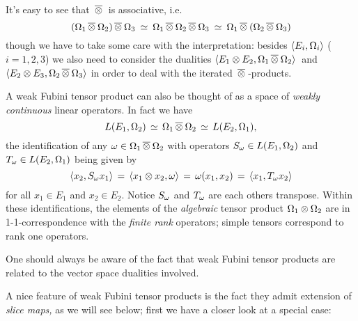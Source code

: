 \begin{remarks_chp} \label{rem:weak_fubtens}
\item
  It's easy to see that $\,\overline{\otimes}\:$ is associative, i.e.
  $$   (\Omega_1 \,\overline{\otimes}\: \Omega_2) \,\overline{\otimes}\: \Omega_3
     \:\simeq\: \Omega_1 \,\overline{\otimes}\: \Omega_2 \,\overline{\otimes}\: \Omega_3
     \:\simeq\: \Omega_1 \,\overline{\otimes}\: (\Omega_2 \,\overline{\otimes}\: \Omega_3) $$
  though we have to take some care with the interpretation:
  besides $\langle E_i,\Omega_i \rangle$ ($i=1,2,3$) we also need to consider the
  dualities \mbox{$\langle E_1 \otimes E_2,\Omega_1 \,\overline{\otimes}\: \Omega_2 \rangle$}\ and
  $\langle E_2 \otimes E_3,\Omega_2 \,\overline{\otimes}\: \Omega_3 \rangle$ in order to deal with
  the iterated $\,\overline{\otimes}\:$-products.
\item
  A weak Fubini tensor product can also be thought of as a space of
  {\em weakly continuous\/} linear operators. In fact we have
  $$ L(E_1,\Omega_2) \,\simeq\, \Omega_1 \,\overline{\otimes}\: \Omega_2 \,\simeq\, L(E_2,\Omega_1),$$
  the identification of any $\omega \in \Omega_1 \,\overline{\otimes}\: \Omega_2$ with
  operators $S_\omega \in L(E_1,\Omega_2)$ and $T_\omega \in L(E_2,\Omega_1)$
  being given by
  $$ \langle x_2,S_\omega x_1 \rangle
               \,=\, \langle x_1 \otimes x_2,\omega \rangle \,=\, \omega(x_1,x_2)
                           \,=\, \langle x_1,T_\omega x_2 \rangle $$
  for all $x_1 \in E_1$ and $x_2 \in E_2$\@. Notice $S_\omega$ and
  $T_\omega$ are each others transpose.
  Within these identifications, the elements of the {\em algebraic\/}
  tensor product $\Omega_1\otimes\Omega_2$ are in 1-1-correspondence
  with the {\em finite rank\/} operators\@; simple tensors
  correspond to rank one operators.
\item
  One should always be aware of the fact that weak Fubini tensor products
  are related to the vector space dualities involved.
\end{remarks_chp}


A nice feature of weak Fubini tensor products is the fact they admit
extension of {\em slice maps,\/} as we will see below;
first we have a closer look at a special case:


